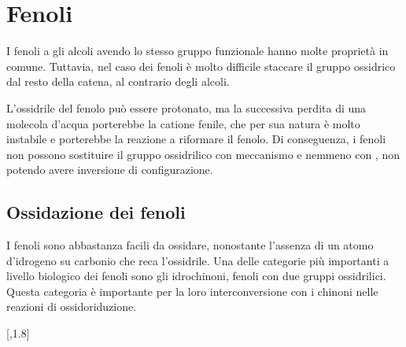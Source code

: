 \section{Fenoli}
I fenoli a gli alcoli avendo lo stesso gruppo funzionale hanno molte proprietà in comune. Tuttavia, nel caso dei fenoli è molto difficile staccare il gruppo ossidrico dal resto della catena, al contrario degli alcoli.

L'ossidrile del fenolo può essere protonato, ma la successiva perdita di una molecola d'acqua porterebbe la catione fenile, che per sua natura è molto instabile e porterebbe la reazione a riformare il fenolo. Di conseguenza, i fenoli non possono sostituire il gruppo ossidrilico con meccanismo \mech[1] e nemmeno con \mech[2], non potendo avere inversione di configurazione.

\subsection{Ossidazione dei fenoli}
I fenoli sono abbastanza facili da ossidare, nonostante l'assenza di un atomo d'idrogeno su carbonio che reca l'ossidrile. Una delle categorie più importanti a livello biologico dei fenoli sono gli idrochinoni, fenoli con due gruppi ossidrilici. Questa categoria è importante per la loro interconversione con i chinoni nelle reazioni di ossidoriduzione.
\begingroup
	\chemnameinit{}
	\begin{reaction}
	\end{reaction}
\endgroup